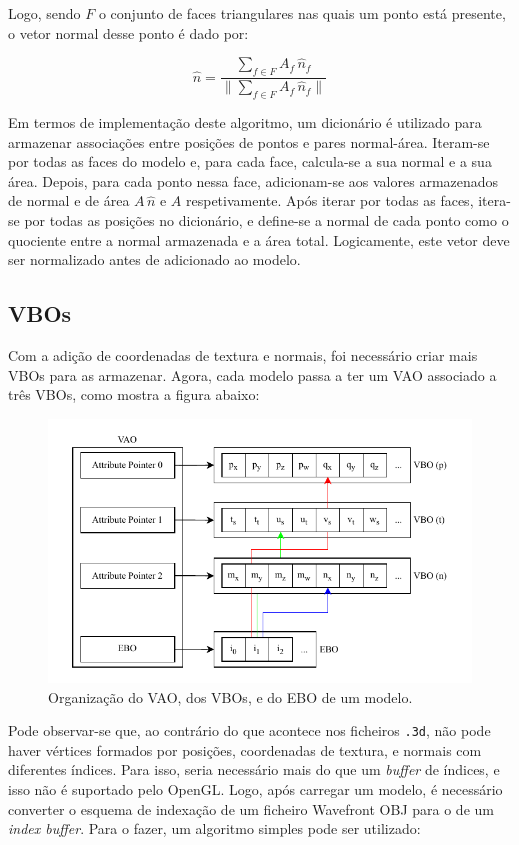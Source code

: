 \documentclass[12pt, a4paper]{article}
\begin{document}
Logo, sendo $F$ o conjunto de faces triangulares nas quais um ponto está presente, o vetor normal
desse ponto é dado por:

$$
\hat{n} = \frac{
    \sum_{f \in F} {A_f \, \hat{n}_f}
}{
    \lVert \sum_{f \in F} {A_f \, \hat{n}_f} \rVert
}
$$

Em termos de implementação deste algoritmo, um dicionário é utilizado para armazenar associações
entre posições de pontos e pares normal-área. Iteram-se por todas as faces do modelo e, para
cada face, calcula-se a sua normal e a sua área. Depois, para cada ponto nessa face, adicionam-se
aos valores armazenados de normal e de área $A \, \hat{n}$ e $A$ respetivamente. Após iterar por
todas as faces, itera-se por todas as posições no dicionário, e define-se a normal de cada ponto
como o quociente entre a normal armazenada e a área total. Logicamente, este vetor deve ser
normalizado antes de adicionado ao modelo.

\subsection{VBOs}

Com a adição de coordenadas de textura e normais, foi necessário criar mais VBOs para as armazenar.
Agora, cada modelo passa a ter um VAO associado a três VBOs, como mostra a figura abaixo:

\begin{figure}[H]
    \centering
    \includegraphics[width=\textwidth]{res/phase4/VAO.pdf}
    \caption{Organização do VAO, dos VBOs, e do EBO de um modelo.}
\end{figure}

Pode observar-se que, ao contrário do que acontece nos ficheiros \texttt{.3d}, não pode haver
vértices formados por posições, coordenadas de textura, e normais com diferentes índices. Para isso,
seria necessário mais do que um \emph{buffer} de índices, e isso não é suportado pelo OpenGL. Logo,
após carregar um modelo, é necessário converter o esquema de indexação de um ficheiro Wavefront OBJ
para o de um \emph{index buffer}. Para o fazer, um algoritmo simples pode ser utilizado:
\end{document}

